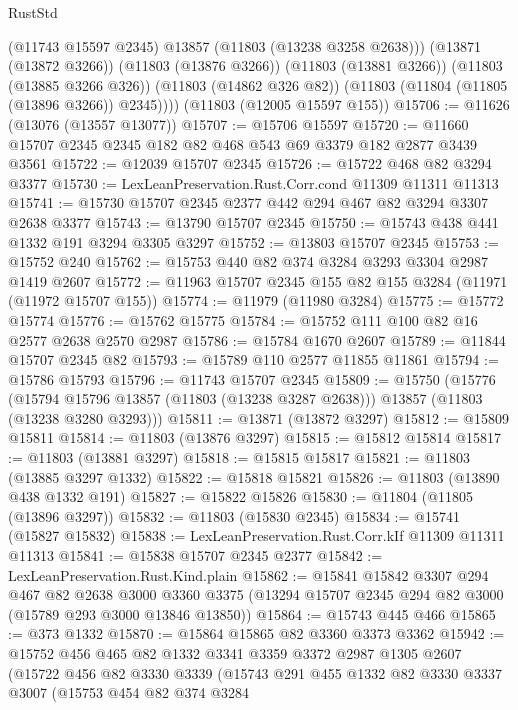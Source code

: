 \begin{lexlean}{RustStd}
\begin{coremodule}
          (@11743 @15597 @2345)
          @13857
          (@11803 (@13238 @3258 @2638)))
        (@13871 (@13872 @3266))
        (@11803 (@13876 @3266))
        (@11803 (@13881 @3266))
        (@11803 (@13885 @3266 @326))
        (@11803 (@14862 @326 @82))
        (@11803 (@11804 (@11805 (@13896 @3266)) @2345))))
    (@11803 (@12005 @15597 @155))
@15706 := @11626 (@13076 (@13557 @13077))
@15707 := @15706 @15597
@15720 := @11660 @15707 @2345 @2345 @182 @82 @468 @543 @69 @3379 @182 @2877 @3439 @3561
@15722 := @12039 @15707 @2345
@15726 := @15722 @468 @82 @3294 @3377
@15730 := LexLeanPreservation.Rust.Corr.cond @11309 @11311 @11313
@15741 := @15730 @15707 @2345 @2377 @442 @294 @467 @82 @3294 @3307 @2638 @3377
@15743 := @13790 @15707 @2345
@15750 := @15743 @438 @441 @1332 @191 @3294 @3305 @3297
@15752 := @13803 @15707 @2345
@15753 := @15752 @240
@15762 := @15753 @440 @82 @374 @3284 @3293 @3304 @2987 @1419 @2607
@15772 := @11963 @15707 @2345 @155 @82 @155 @3284 (@11971 (@11972 @15707 @155))
@15774 := @11979 (@11980 @3284)
@15775 := @15772 @15774
@15776 := @15762 @15775
@15784 := @15752 @111 @100 @82 @16 @2577 @2638 @2570 @2987
@15786 := @15784 @1670 @2607
@15789 := @11844 @15707 @2345 @82
@15793 := @15789 @110 @2577 @11855 @11861
@15794 := @15786 @15793
@15796 := @11743 @15707 @2345
@15809 := @15750
    (@15776
      (@15794 @15796 @13857 (@11803 (@13238 @3287 @2638)))
      @13857
      (@11803 (@13238 @3280 @3293)))
@15811 := @13871 (@13872 @3297)
@15812 := @15809 @15811
@15814 := @11803 (@13876 @3297)
@15815 := @15812 @15814
@15817 := @11803 (@13881 @3297)
@15818 := @15815 @15817
@15821 := @11803 (@13885 @3297 @1332)
@15822 := @15818 @15821
@15826 := @11803 (@13890 @438 @1332 @191)
@15827 := @15822 @15826
@15830 := @11804 (@11805 (@13896 @3297))
@15832 := @11803 (@15830 @2345)
@15834 := @15741 (@15827 @15832)
@15838 := LexLeanPreservation.Rust.Corr.kIf @11309 @11311 @11313
@15841 := @15838 @15707 @2345 @2377
@15842 := LexLeanPreservation.Rust.Kind.plain
@15862 := @15841
    @15842
    @3307
    @294
    @467
    @82
    @2638
    @3000
    @3360
    @3375
    (@13294 @15707 @2345 @294 @82 @3000 (@15789 @293 @3000 @13846 @13850))
@15864 := @15743 @445 @466
@15865 := @373 @1332
@15870 := @15864 @15865 @82 @3360 @3373 @3362
@15942 := @15752
    @456
    @465
    @82
    @1332
    @3341
    @3359
    @3372
    @2987
    @1305
    @2607
    (@15722
      @456
      @82
      @3330
      @3339
      (@15743
        @291
        @455
        @1332
        @82
        @3330
        @3337
        @3007
        (@15753
          @454
          @82
          @374
          @3284

\end{coremodule}
\end{lexlean}
